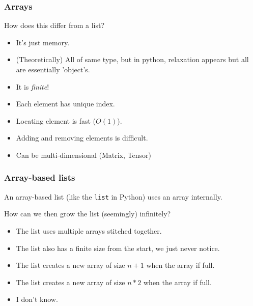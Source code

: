\begin{frame}
	\frametitle{Arrays}

	
			How does this differ from a list?

			\begin{itemize}
				\item It's just memory.
				\item (Theoretically) All of same type, but in python, relaxation appears but all are essentially 'object's.
				\item It is \textit{finite}!
				\item Each element has unique index.
				\item Locating element is fast ($O(1)$).
				\item Adding and removing elements is difficult.
				\item Can be multi-dimensional (Matrix, Tensor)
			\end{itemize}


\end{frame}

\begin{frame}
	\frametitle{Array-based lists}

		An array-based list (like the \texttt{list} in Python) uses an array internally.

		How can we then grow the list (seemingly) infinitely?
		\begin{itemize}
			\item The list uses multiple arrays stitched together.
			\item The list also has a finite size from the start, we just never notice.
			\item The list creates a new array of size $n+1$ when the array if full.
			\item The list creates a new array of size $n*2$ when the array if full.
			\item I don't know.
		\end{itemize}

\end{frame}

